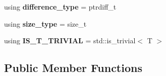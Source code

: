 \begin{DoxyCompactItemize}
\item 
\mbox{\label{classsc2d_1_1vec_ac0b76a37a881547569fafede977f4e3a}} 
using {\bfseries difference\+\_\+type} = ptrdiff\+\_\+t
\item 
\mbox{\label{classsc2d_1_1vec_afd3f823ff9c119233468f7faf9891362}} 
using {\bfseries size\+\_\+type} = size\+\_\+t
\item 
\mbox{\label{classsc2d_1_1vec_abeec1f33a18a56daa31212b8c5aaa036}} 
using {\bfseries I\+S\+\_\+\+T\+\_\+\+T\+R\+I\+V\+I\+AL} = std\+::is\+\_\+trivial$<$ T $>$
\end{DoxyCompactItemize}
\subsection*{Public Member Functions}

